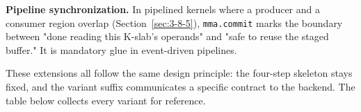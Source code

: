 \textbf{Pipeline synchronization.} In pipelined kernels where a producer and a consumer region overlap (Section~\ref{sec:3-8-5}), \texttt{mma.commit} marks the boundary between "done reading this K-slab's operands" and "safe to reuse the staged buffer." It is mandatory glue in event-driven pipelines.

These extensions all follow the same design principle: the four-step skeleton stays fixed, and the variant suffix communicates a specific contract to the backend. The table below collects every variant for reference.
